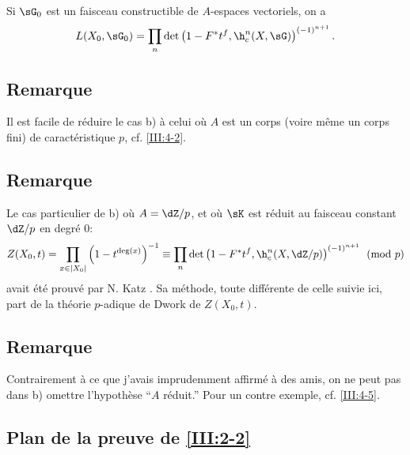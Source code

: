 Si $\sG_0$ est un faisceau constructible de $A$-espaces vectoriels, on a 
\[
  L(X_0,\sG_0) = \prod_n \det\left(1-F^* t^f,\h_c^n(X,\sG)\right)^{(-1)^{n+1}} \text{.}
\]





\subsection{Remarque}\label{III:2-5}

Il est facile de réduire le cas b) à celui où $A$ est un corps (voire 
même un corps fini) de caractéristique $p$, cf. \ref{III:4-2}. 





\subsection{Remarque}\label{III:2-6}

Le cas particulier de b) où $A=\dZ/p$, et où $\sK$ est réduit au faisceau 
constant $\dZ/p$ en degré $0$:
\[
  Z(X_0,t) = \prod_{x\in |X_0|} \left(1-t^{\deg(x)}\right)^{-1}
      \equiv \prod_n \det\left(1-F^* t^f,\h_c^n(X,\dZ/p)\right)^{(-1)^{n+1}} \pmod p
\]
avait été prouvé par N. Katz . Sa méthode, toute 
différente de celle suivie ici, part de la théorie $p$-adique de Dwork de 
$Z(X_0,t)$. 





\subsection{Remarque}\label{III:2-7}


Contrairement à ce que j'avais imprudemment affirmé à des amis, on ne 
peut pas dans b) omettre l'hypothèse ``$A$ réduit.'' Pour un contre 
exemple, cf. \ref{III:4-5}. 





\subsection{Plan de la preuve de \ref{III:2-2}}\label{III:2-8}

